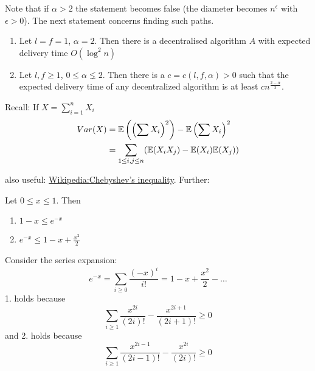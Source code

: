 Note that if $\alpha > 2$ the statement becomes false (the diameter becomes $n^\epsilon$ with $\epsilon > 0$). The next statement concerns finding such paths.

\begin{thm}\label{thm:finding_short_paths} \mbox{}\begin{enumerate}
\item Let $l=f=1$, $\alpha =2$. Then there is a decentralised algorithm $A$ with expected delivery time $O(\log^2n)$
\item Let $l,f\geq 1$, $0 \leq \alpha \lneq 2$. Then there is a $c=c(l,f,\alpha)>0$ such that the expected delivery time of any decentralized algorithm is at least $c n^{\frac{2-\alpha}{3}}$.
\end{enumerate}
\end{thm}

Recall: If $X = \sum_{i=1}^n X_i$
\begin{align*}
Var(X) &= \mathbb{E}\left(\left(\sum X_i\right)^2\right) - \mathbb{E}\left(\sum X_i\right)^2\\
	&= \sum_{1\leq i, j\leq n} (\mathbb{E}(X_iX_j) - \mathbb{E}(X_i)\mathbb{E}(X_j))
\end{align*}

also useful: \href{http://en.wikipedia.org/wiki/Chebyshev\%27s_inequality}{Wikipedia:Chebyshev's inequality}. Further:

\begin{lem} Let $0\leq x \leq 1$. Then
\begin{enumerate}
\item $1-x\leq e^{-x}$
\item $e^{-x} \leq 1-x+\frac{x^2}{2}$
\end{enumerate}
\end{lem}
\begin{pr} Consider the series expansion:
\[e^{-x} = \sum_{i\geq 0} \frac{(-x)^i}{i!} = 1-x+\frac{x^2}{2} - \ldots\]
1. holds because 
\[\sum_{i\geq 1} \frac{x^{2i}}{(2i)!} - \frac{x^{2i+1}}{(2i+1)!} \geq 0\]
and 2. holds because
\[\sum_{i\geq 1} \frac{x^{2i-1}}{(2i-1)!} - \frac{x^{2i}}{(2i)!} \geq 0\]
\end{pr}

